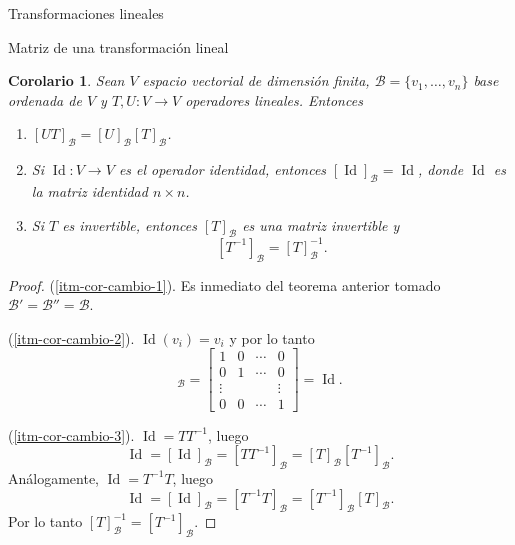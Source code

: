 \documentclass[a4paper,12pt,twoside,spanish,reqno]{amsbook}
\newtheorem{corolario}[teorema]{Corolario}
\theoremstyle{definition}
\theoremstyle{remark}
\newcommand{\Id}{\operatorname{Id}}
\begin{document}
\begin{chapter}{Transformaciones lineales}
\begin{section}{Matriz de una transformación lineal}
        \begin{corolario}\label{cor-5.6} Sean $V$ espacio vectorial de dimensión finita, $\mathcal B = \{v_1,\ldots,v_n\}$ base ordenada de $V$ y $T,U: V \to V$ operadores lineales. Entonces
            \begin{enumerate}
                \item\label{itm-cor-cambio-1} $[UT]_{\mathcal B} = [U]_{\mathcal B} [T]_{\mathcal B}$.
                \item\label{itm-cor-cambio-2} Si $\Id: V \to V$  es el operador identidad, entonces $[\Id]_{\mathcal B} =\Id$,  donde $\Id$  es la matriz identidad $n \times n$.
                \item\label{itm-cor-cambio-3} Si $T$  es invertible,  entonces $[T]_{\mathcal B}$  es una matriz invertible y  $$[T^{-1}]_{\mathcal B} = [T]_{\mathcal B}^{-1}.$$
            \end{enumerate}
        \end{corolario}
        \begin{proof}
            (\ref{itm-cor-cambio-1}). Es inmediato del teorema anterior tomado $\mathcal B' =\mathcal B'' = \mathcal B$. 
            
            (\ref{itm-cor-cambio-2}). $\Id(v_i) = v_i$ y por lo tanto
            \begin{equation*}
                [\Id]_{\mathcal B} = \begin{bmatrix} 1&0&\cdots&0 \\0&1&\cdots&0\\\vdots&&&\vdots\\0&0&\cdots&1 	\end{bmatrix} = \Id.
            \end{equation*}
            
            
            (\ref{itm-cor-cambio-3}). $\Id = T T^{-1}$, luego
            \begin{equation*}
                \Id = [\Id]_{\mathcal B} =  [T T^{-1}]_{\mathcal B} =  [T]_{\mathcal B} [T^{-1}]_{\mathcal B}.
            \end{equation*}
             Análogamente, $\Id = T^{-1} T$, luego
            \begin{equation*}
            \Id = [\Id]_{\mathcal B} =  [T^{-1} T]_{\mathcal B} =  [T^{-1}]_{\mathcal B} [T]_{\mathcal B}. 
            \end{equation*}
            Por  lo tanto $[T]_{\mathcal B}^{-1} = [T^{-1}]_{\mathcal B}$.
        \end{proof}	
    

\end{section}
\end{chapter}
\end{document}

